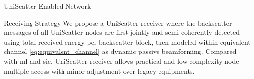 \documentclass[journal]{IEEEtran}
\begin{document}
\begin{section}{UniScatter-Enabled Network}
	\begin{subsection}{Receiving Strategy}
		We propose a UniScatter receiver where the backscatter messages of all UniScatter nodes are first jointly and semi-coherently detected using total received energy per backscatter block, then modeled within equivalent channel \eqref{eq:equivalent_channel} as dynamic passive beamforming.
		Compared with \gls{ml} and \gls{sic}, UniScatter receiver allows practical and low-complexity node multiple access with minor adjustment over legacy equipments.


\end{subsection}
\end{section}
\end{document}
